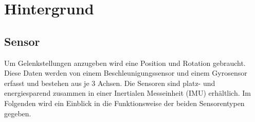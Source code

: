 \chapter{Hintergrund}
\label{ch:background}

\section{Sensor}
Um Gelenkstellungen anzugeben wird eine Position und Rotation gebraucht.
Diese Daten werden von einem Beschleunigungssensor und einem Gyrosensor erfasst und bestehen aus je 3 Achsen.
Die Sensoren sind platz- und energiesparend zusammen in einer Inertialen Messeinheit (IMU) erhältlich.
Im Folgenden wird ein Einblick in die Funktionsweise der beiden Sensorentypen gegeben.

